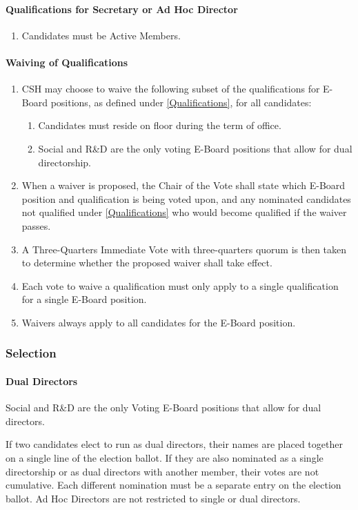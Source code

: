 \documentclass{article}
\newcommand{\asubsection}[1]{\subsubsection{#1} \label{#1}}
\newcommand{\asubsubsection}[1]{\paragraph{#1} \label{#1}}
\begin{document}
\asubsubsection{Qualifications for Secretary or Ad Hoc Director}
\begin{enumerate}
	\item Candidates must be Active Members.
\end{enumerate}

\asubsubsection{Waiving of Qualifications}
\begin{enumerate}
	\item CSH may choose to waive the following subset of the qualifications for E-Board positions, as defined under \ref{Qualifications}, for all candidates:
	      \begin{enumerate}
		      \item Candidates must reside on floor during the term of office.
		      \item Social and R\&D are the only voting E-Board positions that allow for dual directorship.
	      \end{enumerate}
	\item When a waiver is proposed, the Chair of the Vote shall state which E-Board position and qualification is being voted upon, and any nominated candidates not qualified under \ref{Qualifications} who would become qualified if the waiver passes.
	\item A Three-Quarters Immediate Vote with three-quarters quorum is then taken to determine whether the proposed waiver shall take effect.
	\item Each vote to waive a qualification must only apply to a single qualification for a single E-Board position.
	\item Waivers always apply to all candidates for the E-Board position.
\end{enumerate}

\asubsection{Selection}

\asubsubsection{Dual Directors}
Social and R\&D are the only Voting E-Board positions that allow for dual directors.

If two candidates elect to run as dual directors, their names are placed together on a single line of the election ballot.
If they are also nominated as a single directorship or as dual directors with another member, their votes are not cumulative.
Each different nomination must be a separate entry on the election ballot.
Ad Hoc Directors are not restricted to single or dual directors.
\end{document}
